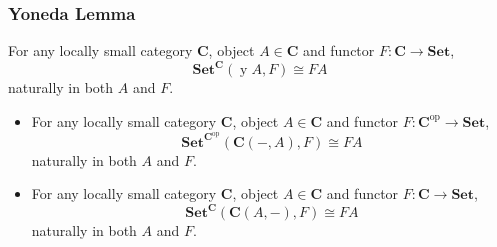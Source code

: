 \documentclass[UTF8,11pt,colorlinks,compress,openany]{beamer}%
\begin{document}
\begin{frame}\frametitle{Yoneda Lemma}
\begin{theorem}
	For any locally small category $\mathbf{C}$, object $A\in\mathbf{C}$ and functor $F: \mathbf{C}\to\mathbf{Set}$,
	\[
		\mathbf{Set}^\mathbf{C}(\operatorname{y}A,F)\cong FA
	\]
	naturally in both $A$ and $F$.
\end{theorem}
\begin{theorem}
\begin{itemize}
	\item For any locally small category $\mathbf{C}$, object $A\in\mathbf{C}$ and functor $F: \mathbf{C}^\mathrm{op}\to\mathbf{Set}$,
	\[
		\mathbf{Set}^{\mathbf{C}^\mathrm{op}}(\mathbf{C}(-,A),F)\cong FA
	\]
	naturally in both $A$ and $F$.
	\item For any locally small category $\mathbf{C}$, object $A\in\mathbf{C}$ and functor $F: \mathbf{C}\to\mathbf{Set}$,
	\[
		\mathbf{Set}^\mathbf{C}(\mathbf{C}(A,-),F)\cong FA
	\]
	naturally in both $A$ and $F$.
\end{itemize}
\end{theorem}
\end{frame}
\end{document}
